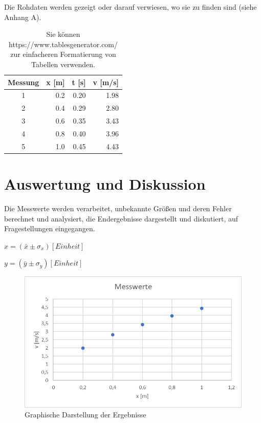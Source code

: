 \documentclass[10pt,a4paper]{article}
\begin{document}
Die Rohdaten werden gezeigt oder darauf verwiesen, wo sie zu finden sind (siehe Anhang A).

\begin{table}[H]
\center
\begin{tabular}{crrr}
\toprule
Messung & x [m] & t [s] & v [m/s] \\
\midrule
1 & 0.2 & 0.20 & 1.98 \\
2 & 0.4 & 0.29 & 2.80 \\
3 & 0.6 & 0.35 & 3.43 \\
4 & 0.8 & 0.40 & 3.96 \\
5 & 1.0 & 0.45 & 4.43 \\
\bottomrule
\end{tabular}
\caption{Sie können https://www.tablesgenerator.com/ zur einfacheren Formatierung von Tabellen verwenden.}
\label{tabelle1}
\end{table}


\section{Auswertung und Diskussion} %

Die Messwerte werden verarbeitet, unbekannte Größen und deren Fehler berechnet und analysiert, die Endergebnisse dargestellt und diskutiert, auf Fragestellungen eingegangen.

\medskip

\centerline{$x = (\bar{x} \pm \sigma_x) [Einheit]$}

\medskip

\centerline{\colorbox{fh_green}{$y = (\bar{y} \pm \sigma_y) [Einheit]$}}

\medskip

\centerline{}

\begin{figure}[H]
\centering
    \includegraphics[scale=2]{bilder/Messwerte.png}
  \caption{Graphische Darstellung der Ergebnisse}
  \label{Ergebnisse}
\end{figure}
\end{document}
